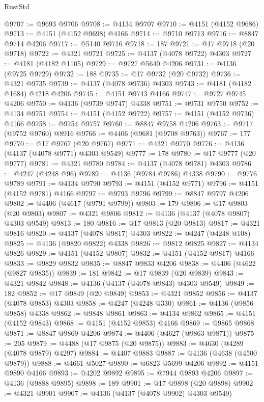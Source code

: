 \begin{lexlean}{RustStd}
\begin{coremodule}
{\begin{coremodule}
{{{{{{{{{{{{{{{{{{{{{{{{{{{{{{{{{{{{{{{{{{{{{{{{{{@9707 := @9693 @9706
@9708 := @4134 @9707
@9710 := @4151 (@4152 @9686)
@9713 := @4151 (@4152 @9698) @4166
@9714 := @9710 @9713
@9716 := @8847 @9714 @4206
@9717 := @5140 @9716
@9718 := 187
@9721 := @17 @9718 (@20 @9718)
@9722 := @4321 @9721
@9725 := @4137 (@4078 @9722) @4303
@9727 := @4181 (@4182 @1105)
@9729 := @9727 @5640 @4206
@9731 := @4136 (@9725 @9729)
@9732 := 188
@9735 := @17 @9732 (@20 @9732)
@9736 := @4321 @9735
@9739 := @4137 (@4078 @9736) @4303
@9743 := @4181 (@4182 @1684) @4218 @4206
@9745 := @4151 @9743 @4166
@9747 := @9727 @9745 @4206
@9750 := @4136 (@9739 @9747) @4338
@9751 := @9731 @9750
@9752 := @4134 @9751
@9754 := @4151 (@4152 @9722)
@9757 := @4151 (@4152 @9736) @4166
@9758 := @9754 @9757
@9760 := @8847 @9758 @4206
@9763 := @9717 (@9752 @9760) @8916
@9766 := @4406 (@9681 (@9708 @9763))
@9767 := 177
@9770 := @17 @9767 (@20 @9767)
@9771 := @4321 @9770
@9776 := @4136 (@4137 (@4078 @9771) @4303 @9549)
@9777 := 178
@9780 := @17 @9777 (@20 @9777)
@9781 := @4321 @9780
@9784 := @4137 (@4078 @9781) @4303
@9786 := @4247 (@4248 @96)
@9789 := @4136 (@9784 @9786) @4338
@9790 := @9776 @9789
@9791 := @4134 @9790
@9793 := @4151 (@4152 @9771)
@9796 := @4151 (@4152 @9781) @4166
@9797 := @9793 @9796
@9799 := @8847 @9797 @4206
@9802 := @4406 (@4617 (@9791 @9799))
@9803 := 179
@9806 := @17 @9803 (@20 @9803)
@9807 := @4321 @9806
@9812 := @4136 (@4137 (@4078 @9807) @4303 @9549)
@9813 := 180
@9816 := @17 @9813 (@20 @9813)
@9817 := @4321 @9816
@9820 := @4137 (@4078 @9817) @4303
@9822 := @4247 (@4248 @108)
@9825 := @4136 (@9820 @9822) @4338
@9826 := @9812 @9825
@9827 := @4134 @9826
@9829 := @4151 (@4152 @9807)
@9832 := @4151 (@4152 @9817) @4166
@9833 := @9829 @9832
@9835 := @8847 @9833 @4206
@9838 := @4406 (@4622 (@9827 @9835))
@9839 := 181
@9842 := @17 @9839 (@20 @9839)
@9843 := @4321 @9842
@9848 := @4136 (@4137 (@4078 @9843) @4303 @9549)
@9849 := 182
@9852 := @17 @9849 (@20 @9849)
@9853 := @4321 @9852
@9856 := @4137 (@4078 @9853) @4303
@9858 := @4247 (@4248 @330)
@9861 := @4136 (@9856 @9858) @4338
@9862 := @9848 @9861
@9863 := @4134 @9862
@9865 := @4151 (@4152 @9843)
@9868 := @4151 (@4152 @9853) @4166
@9869 := @9865 @9868
@9871 := @8847 @9869 @4206
@9874 := @4406 (@4627 (@9863 @9871))
@9875 := 205
@9879 := @4488 (@17 @9875 (@20 @9875))
@9883 := @4630 (@4289 (@4078 @9879) @4297)
@9884 := @4407 @9883
@9887 := @4136 (@4638 (@4500 @9879))
@9888 := @4661 @5027
@9890 := @6823 @5699 @4206
@9892 := @4151 @9890 @4166
@9893 := @4202 @9892
@9895 := @7944 @9893 @4206
@9897 := @4136 (@9888 @9895)
@9898 := 189
@9901 := @17 @9898 (@20 @9898)
@9902 := @4321 @9901
@9907 := @4136 (@4137 (@4078 @9902) @4303 @9549)
}}}}}}}}}}}}}}}}}}}}}}}}}}}}}}}}}}}}}}}}}}}}}}}}}}
\end{coremodule}}
\end{coremodule}
\end{lexlean}
